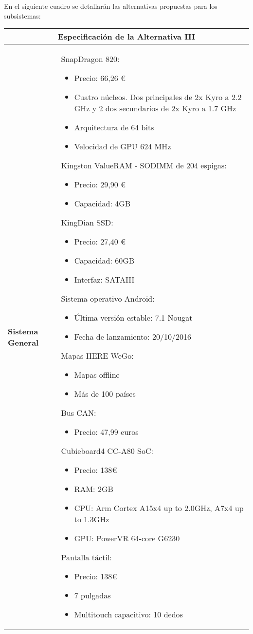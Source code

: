 \par En el siguiente cuadro se detallarán las alternativas propuestas para los subsistemas:

\begin{table}[H]
\begin{center}
\begin{tabular}{p{5cm} p{8cm}}
\multicolumn{2}{c}{\textbf{Especificación de la Alternativa III} } \\
\hline \hline

\textbf{Sistema General} &
SnapDragon 820:
\begin{itemize}
    \item Precio: 66,26 €
    \item Cuatro núcleos. Dos principales de 2x Kyro a 2.2 GHz y 2 dos secundarios de 2x Kyro a 1.7 GHz
    \item Arquitectura de 64 bits
    \item Velocidad de GPU 624 MHz
\end{itemize}
Kingston ValueRAM - SODIMM de 204 espigas:
\begin{itemize}
    \item Precio: 29,90 €
    \item Capacidad: 4GB
\end{itemize}
KingDian SSD:
\begin{itemize}
    \item Precio: 27,40 €
    \item Capacidad: 60GB
    \item Interfaz: SATAIII
\end{itemize}
Sistema operativo Android:
\begin{itemize}
    \item Última versión estable: 7.1 Nougat
    \item Fecha de lanzamiento: 20/10/2016
\end{itemize}
Mapas HERE WeGo:
\begin{itemize}
    \item Mapas offline
    \item Más de 100 países
\end{itemize}
Bus CAN:
\begin{itemize}
    \item Precio: 47,99 euros
\end{itemize}
Cubieboard4 CC-A80 SoC:
\begin{itemize}
    \item Precio: 138€
    \item RAM: 2GB
    \item CPU:	Arm Cortex A15x4 up to 2.0GHz, A7x4 up to 1.3GHz
    \item GPU:	PowerVR 64-core G6230
\end{itemize}
Pantalla táctil:
\begin{itemize}
    \item Precio: 138€
    \item 7 pulgadas
    \item Multitouch capacitivo: 10 dedos
\end{itemize}
\\ \hline


\end{tabular}
\end{center}
\end{table}

